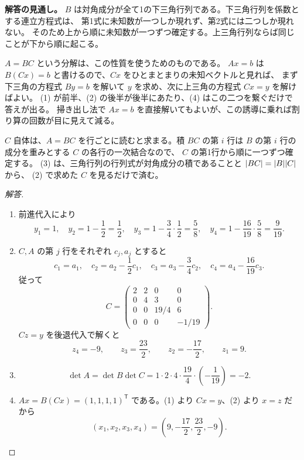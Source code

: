 \begin{memo*}
\textbf{解答の見通し。}
$B$ は対角成分が全て1の下三角行列である。下三角行列を係数とする連立方程式は、
第1式に未知数が一つしか現れず、第2式には二つしか現れない。
そのため上から順に未知数が一つずつ確定する。上三角行列ならば同じことが下から順に起こる。

$A=BC$ という分解は、この性質を使うためのものである。
$Ax=b$ は $B(Cx)=b$ と書けるので、$Cx$ をひとまとまりの未知ベクトルと見れば、
まず下三角の方程式 $By=b$ を解いて $y$ を求め、次に上三角の方程式 $Cx=y$ を解けばよい。
(1) が前半、(2) の後半が後半にあたり、(4) はこの二つを繋ぐだけで答えが出る。
掃き出し法で $Ax=b$ を直接解いてもよいが、この誘導に乗れば割り算の回数が目に見えて減る。

$C$ 自体は、$A=BC$ を行ごとに読むと求まる。積 $BC$ の第 $i$ 行は
$B$ の第 $i$ 行の成分を重みとする $C$ の各行の一次結合なので、
$C$ の第1行から順に一つずつ確定する。
(3) は、三角行列の行列式が対角成分の積であることと $\lvert BC \rvert=\lvert B \rvert\lvert C \rvert$ から、
(2) で求めた $C$ を見るだけで済む。
\end{memo*}
\begin{proof}[解答]
\begin{enumerate}
  \item[(1)] 前進代入により
  \[
  y_1=1,\quad
  y_2=1-\frac12=\frac12,\quad
  y_3=1-\frac34\cdot\frac12=\frac58,\quad
  y_4=1-\frac{16}{19}\cdot\frac58=\frac9{19}.
  \]

  \item[(2)] $C,A$ の第 $j$ 行をそれぞれ $c_j,a_j$ とすると
  \[
  c_1=a_1,\quad c_2=a_2-\frac12c_1,\quad
  c_3=a_3-\frac34c_2,\quad c_4=a_4-\frac{16}{19}c_3.
  \]
  従って
  \[
  C=\begin{pmatrix}
  2&2&0&0\\
  0&4&3&0\\
  0&0&19/4&6\\
  0&0&0&-1/19
  \end{pmatrix}.
  \]
  $Cz=y$ を後退代入で解くと
  \[
  z_4=-9,\qquad z_3=\frac{23}{2},\qquad
  z_2=-\frac{17}{2},\qquad z_1=9.
  \]

  \item[(3)]
  \[
  \det A=\det B\det C
  =1\cdot2\cdot4\cdot\frac{19}{4}\cdot\left(-\frac1{19}\right)=-2.
  \]

  \item[(4)] $Ax=B(Cx)=(1,1,1,1)^{\mathsf T}$ である。(1) より $Cx=y$、(2) より $x=z$ だから
  \[
  (x_1,x_2,x_3,x_4)=\left(9,-\frac{17}{2},\frac{23}{2},-9\right).
  \]
\end{enumerate}
\end{proof}


